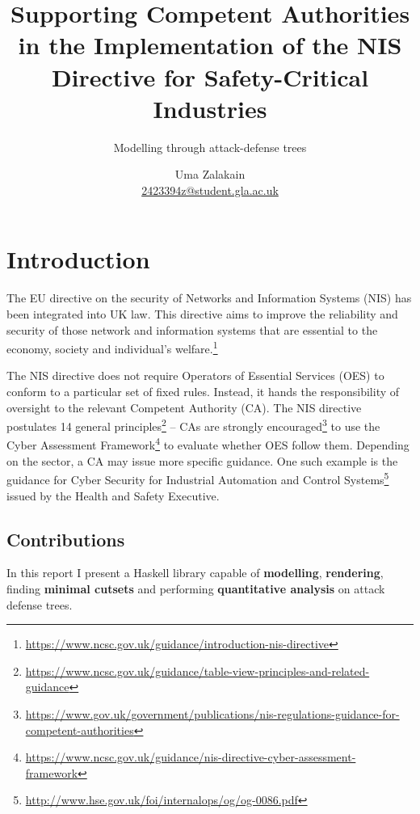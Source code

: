\documentclass{scrreprt}
\begin{document}
\title{Supporting Competent Authorities in the Implementation of the NIS
Directive for Safety-Critical Industries}
\subtitle{Modelling through attack-defense trees}
\author{Uma Zalakain \\ \href{mailto:2423394z@student.gla.ac.uk}{2423394z@student.gla.ac.uk}}

{\let\newpage\relax\maketitle}
\doclicenseThis
\newpage

\setcounter{tocdepth}{2}
\tableofcontents
\newpage
{}

\chapter{Introduction}

The EU directive on the security of Networks and Information Systems (NIS) has
been integrated into UK law. This directive aims to improve the reliability and
security of those network and information systems that are essential to the
economy, society and individual's
welfare.\footnote{\url{https://www.ncsc.gov.uk/guidance/introduction-nis-directive}}

The NIS directive does not require Operators of Essential Services (OES) to
conform to a particular set of fixed rules. Instead, it hands the responsibility
of oversight to the relevant Competent Authority (CA). The NIS directive
postulates 14 general
principles\footnote{\url{https://www.ncsc.gov.uk/guidance/table-view-principles-and-related-guidance}}
-- CAs are strongly
encouraged\footnote{\url{https://www.gov.uk/government/publications/nis-regulations-guidance-for-competent-authorities}}
to use the Cyber Assessment
Framework\footnote{\url{https://www.ncsc.gov.uk/guidance/nis-directive-cyber-assessment-framework}}
to evaluate whether OES follow them. Depending on the sector, a CA may issue
more specific guidance. One such example is the guidance for Cyber Security for
Industrial Automation and Control
Systems\footnote{\url{http://www.hse.gov.uk/foi/internalops/og/og-0086.pdf}}
issued by the Health and Safety Executive.

\section{Contributions}

In this report I present a Haskell library capable of \textbf{modelling},
\textbf{rendering}, finding \textbf{minimal cutsets} and performing
\textbf{quantitative analysis} on attack defense trees.
\end{document}
